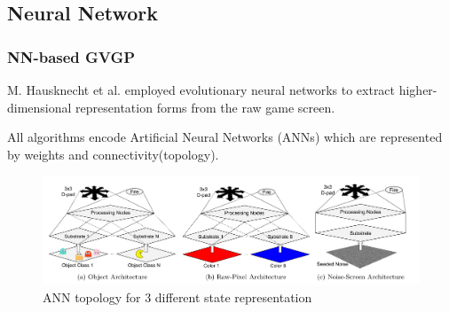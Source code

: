 \documentclass{beamer}
\begin{document}
\subsection{Neural Network}
\begin{frame}
  \frametitle{NN-based GVGP}
  M. Hausknecht et al. \cite{5} employed evolutionary neural networks to extract higher-dimensional representation forms from the raw game screen.

  All algorithms encode Artificial Neural Networks (ANNs) which are represented by weights and connectivity(topology).
  \begin{figure}
    \includegraphics[width=1\linewidth]{figures/m1p1}
    \caption{ANN topology for 3 different state representation}
  \end{figure}
\end{frame}
\end{document}
